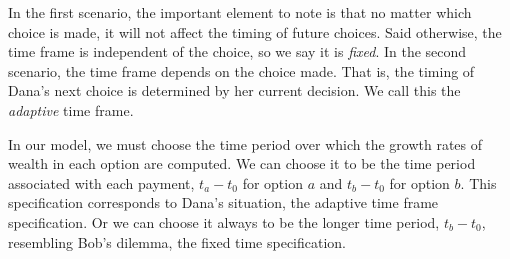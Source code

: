 In the first scenario, the important element to note is that no matter which choice is made, it will not affect the timing of future choices. Said otherwise, the time frame is independent of the choice, so we say it is {\it fixed}.%
In the second scenario, the time frame depends on the choice made. That is, the timing of Dana's next choice is determined by her current decision. We call this the {\it adaptive} time frame.


In our model, we must choose the time period over which the growth rates of wealth in each option are computed. We can choose it to be the time period associated with each payment, \ie $t_a-t_0$ for option $a$ and $t_b-t_0$ for option $b$. This specification corresponds to Dana's situation, the adaptive time frame specification. Or we can choose it always to be the longer time period, $t_b-t_0$, resembling Bob's dilemma, the fixed time specification.





